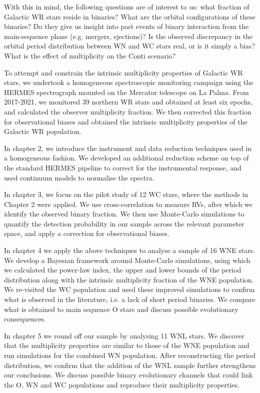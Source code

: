 With this in mind, the following questions are of interest to us: what fraction of Galactic WR stars reside in binaries? What are the orbital configurations of these binaries? Do they give us insight into past events of binary interaction from the main-sequence phase (e.g. mergers, ejections)? Is the observed discrepancy in the orbital period distribution between WN and WC stars real, or is it simply a bias? What is the effect of multiplicity on the Conti scenario?

To attempt and constrain the intrinsic multiplicity properties of Galactic WR stars, we undertook a homogeneous spectroscopic monitoring campaign using the HERMES spectrograph mounted on the Mercator telescope on La Palma. From 2017-2021, we monitored 39 northern WR stars and obtained at least six epochs, and calculated the observer multiplicity fraction. We then corrected this fraction for observational biases and obtained the intrinsic multiplicity properties of the Galactic WR population. 

In chapter 2, we introduce the instrument and data reduction techniques used in a homogeneous fashion. We developed an additional reduction scheme on top of the standard HERMES pipeline to correct for the instrumental response, and used continuum models to normalise the spectra. 

In chapter 3, we focus on the pilot study of 12 WC stars, where the methods in Chapter 2 were applied. We use cross-correlation to measure RVs, after which we identify the observed binary fraction. We then use Monte-Carlo simulations to quantify the detection probability in our sample across the relevant parameter space, and apply a correction for observational biases.

In chapter 4 we apply the above techniques to analyse a sample of 16 WNE stars. We develop a Bayesian framework around Monte-Carlo simulations, using which we calculated the power-law index, the upper and lower bounds of the period distribution along with the intrinsic multiplicity fraction of the WNE population. We re-visited the WC population and used these improved simulations to confirm what is observed in the literature, i.e. a lack of short period binaries. We compare what is obtained to main sequence O stars and discuss possible evolutionary consequences.

In chapter 5 we round off our sample by analysing 11 WNL stars. We discover that the multiplicity properties are similar to those of the WNE population and run simulations for the combined WN population. After reconstructing the period distribution, we confirm that the addition of the WNL sample further strengthens our conclusions. We discuss possible binary evolutionary channels that could link the O, WN and WC populations and reproduce their multiplicity properties. 

